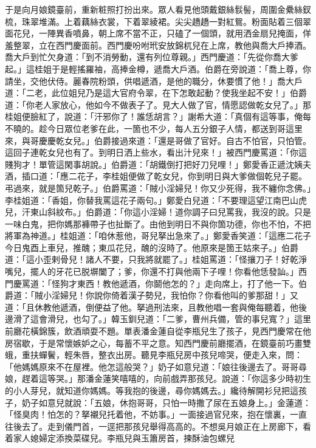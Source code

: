 于是向月娘鏡臺前，重新粧照打扮出來。眾人看見他頭戴銀絲䯼髻，周圍金纍絲釵梳，珠翠堆滿。上着藕絲衣裳，下着翠綾裙。尖尖趫趫一對紅鴛。粉面貼着三個翠面花兒，一陣異香噴鼻，朝上席不當不正，只磕了一個頭，就用洒金扇兒掩面，佯羞整翠，立在西門慶面前。西門慶吩咐玳安放錦杌兒在上席，教他與喬大戶捧酒。喬大戶到忙欠身道：「到不消勞動，還有列位尊親。」西門慶道：「先從你喬大爹起。」這桂姐于是輕搖羅袖，高捧金樽，遞喬大戶酒。伯爵在旁說道：「喬上尊，你請坐，交他伏侍。麗春院粉頭，供唱遞酒，是他的職分，休要慣了他！」喬大戶道：「二老，此位姐兒乃是這大官府令翠，在下怎敢起動？使我坐起不安！」伯爵道：「你老人家放心，他如今不做表子了。見大人做了官，情愿認做乾女兒了。」那桂姐便臉紅了，說道：「汗邪你了！誰恁胡言？」謝希大道：「真個有這等事，俺每不曉的。趁今日眾位老爹在此，一箇也不少，每人五分銀子人情，都送到哥這里來，與哥慶慶乾女兒。」伯爵接過來道：「還是哥做了官好。自古不怕官，只怕管。這回子連乾女兒也有了。到明日洒上些水，看出汁兒來！」被西門慶罵道：「你這賤狗才！單管這閑事胡說。」伯爵道：「胡鐵倒打把好刀兒哩！」鄭愛香正遞沈姨夫酒，插口道：「應二花子，李桂姐便做了乾女兒，你到明日與大爹做個乾兒子罷。弔過來，就是箇兒乾子。」伯爵罵道：「賊小淫婦兒！你又少死得，我不纏你念佛。」李桂姐道：「香姐，你替我罵這花子兩句。」鄭愛白兒道：「不要理這望江南巴山虎兒，汗東山斜紋布。」伯爵道：「你這小淫婦！道你調子曰兒罵我，我沒的說。只是一味白鬼，把你媽那褲帶子也扯斷了。由他到明日不與你箇功德，你也不怕，不把將軍為神道。」桂姐道：「咱休惹他，哥兒拏出急來了。」鄭愛香笑道：「這應二花子今日鬼酉上車兒，推醜；東瓜花兒，醜的沒時了。他原來是箇王姑來子。」伯爵道：「這小歪剌骨兒！諸人不要，只我將就罷了。」桂姐罵道：「怪攘刀子！好乾淨嘴兒，擺人的牙花已脱塀闔了；爹，你還不打與他兩下子哩！你看他恁發訕。」西門慶罵道：「怪狗才東西！教他遞酒，你鬬他怎的？」走向席上，打了他一下。伯爵道：「賊小淫婦兒！你說你倚着漢子勢兒，我怕你？你看他叫的爹那甜！」又道：「且休教他遞酒，倒便益了他。拏過刑法來，且教他唱一套與俺每聽着，他後邊滑了這會滑兒，也勾了。」韓玉釧兒道：「二爹，曹州兵備，管的事兒寬？」這里前廳花橫錦簇，飲酒頑耍不題。單表潘金蓮自從李瓶兒生了孩子，見西門慶常在他房宿歇，于是常懷嫉妒之心，每蓄不平之意。知西門慶前廳擺酒，在鏡臺前巧畫雙蛾，重扶蟬鬢，輕朱唇，整衣出房。聽見李瓶兒房中孩兒啼哭，便走入來，問：「他媽媽原來不在屋裡。他怎這般哭？」奶子如意兒道：「娘往後邊去了。哥哥尋娘，趕着這等哭。」那潘金蓮笑嘻嘻的，向前戲弄那孩兒。說道：「你這多少時初生的小人芽兒，就知道你媽媽。等我抱的後邊，尋你媽媽去。」纔待解開衫兒把這孩子，奶子如意兒就說：「五娘，休抱哥哥，只怕一時撒了尿在五娘身上。」金蓮道：「怪臭肉！怕怎的？拏襯兒托着他，不妨事。」一面接過官兒來，抱在懷裏，一直往後去了。走到儀門首，一逕把那孩兒舉得高高的。不想吳月娘正在上房廊下，看着家人媳婦定添換菜碟兒。李瓶兒與玉簫房首，揀酥油包螺兒 